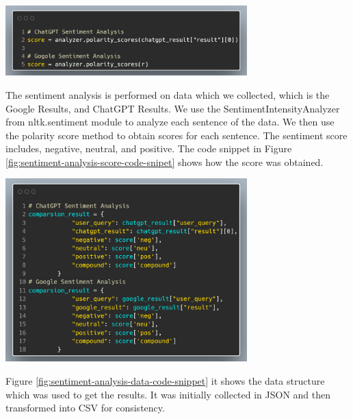 \documentclass[50pt]{usiinfbachelorproject}
\begin{document}
\noindent
\begin{minipage}{\linewidth}
\centering
\includegraphics[width=0.7\textwidth]{images/sentiment-analysis-score-code-snipet.png}
\label{fig:sentiment-analysis-score-code-snipet}
\end{minipage}

The sentiment analysis is performed on data which we collected, which is the Google Results, and ChatGPT Results. We use the SentimentIntensityAnalyzer from nltk.sentiment module to analyze each sentence of the data. We then use the polarity score method to obtain scores for each sentence. The sentiment score includes, negative, neutral, and positive. The code snippet in Figure \ref{fig:sentiment-analysis-score-code-snipet} shows how the score was obtained.

\noindent
\begin{minipage}{\linewidth}
\centering
\includegraphics[width=0.7\textwidth]{images/sentiment-analysis-data-code-snippet.png}
\label{fig:sentiment-analysis-data-code-snippet}
\end{minipage}

Figure \ref{fig:sentiment-analysis-data-code-snippet} it shows the data structure which was used to get the results. It was initially collected in JSON and then transformed into CSV for consistency. 
\end{document}
